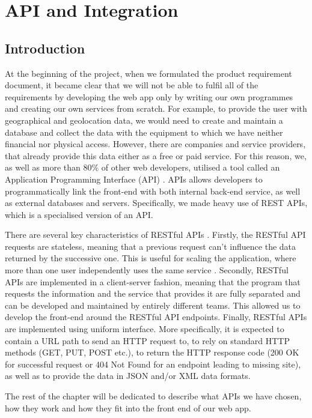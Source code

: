 \section{API and Integration}
\subsection{Introduction}

At the beginning of the project, when we formulated the product requirement document, it became clear that we will not be able to fulfil all of the requirements by developing the web app only by writing our own programmes and creating our own services from scratch. For example, to provide the user with geographical and geolocation data, we would need to create and maintain a database and collect the data with the equipment to which we have neither financial nor physical access. However, there are companies and service providers, that already provide this data either as a free or paid service. For this reason, we, as well as more than 80\% of other web developers, utilised a tool called an Application Programming Interface (API) \cite{what-is-an-api}. APIs allows developers to programmatically link the front-end with both internal back-end service, as well as external databases and servers. Specifically, we made heavy use of REST APIs, which is a specialised version of an API.

There are several key characteristics of RESTful APIs \cite{rest-api-introduction}. Firstly, the RESTful API requests are stateless, meaning that a previous request can't influence the data returned by the successive one. This is useful for scaling the application, where more than one user independently uses the same service \cite{app-scaling}. Secondly, RESTful APIs are implemented in a client-server fashion, meaning that the program that requests the information and the service that provides it are fully separated and can be developed and maintained by entirely different teams. This allowed us to develop the front-end around the RESTful API endpoints. Finally, RESTful APIs are implemented using uniform interface. More specifically, it is expected to contain a URL path to send an HTTP request to, to rely on standard HTTP methods (GET, PUT, POST etc.), to return the HTTP response code (200 OK for successful request or 404 Not Found for an endpoint leading to missing site), as well as to provide the data in JSON and/or XML data formats. 

The rest of the chapter will be dedicated to describe what APIs we have chosen, how they work and how they fit into the front end of our web app. 


